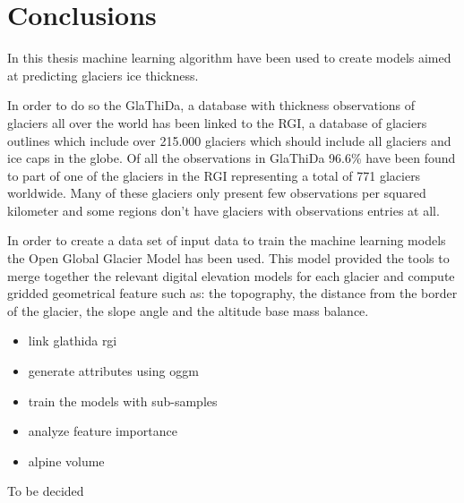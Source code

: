 \chapter{Conclusions}\label{concl}
\thispagestyle{plain}

In this thesis machine learning algorithm have been used to create models aimed at predicting glaciers ice thickness.

In order to do so the GlaThiDa, a database with thickness observations of glaciers all over the world has been linked to the RGI, a database of glaciers outlines which include over 215.000 glaciers which should include all glaciers and ice caps in the globe. Of all the observations in GlaThiDa 96.6\% have been found to part of one of the glaciers in the RGI representing a total of 771 glaciers worldwide. Many of these glaciers only present few observations per squared kilometer and some regions don't have glaciers with observations entries at all.

In order to create a data set of input data to train the machine learning models the Open Global Glacier Model has been used. This model provided the tools to merge together the relevant digital elevation models for each glacier and compute gridded geometrical feature such as: the topography, the distance from the border of the glacier, the slope angle and the altitude base mass balance.

\begin{itemize}
	\item link glathida rgi
	\item generate attributes using oggm
	\item train the models with sub-samples
	\item analyze feature importance
	\item alpine volume
\end{itemize}


To be decided
